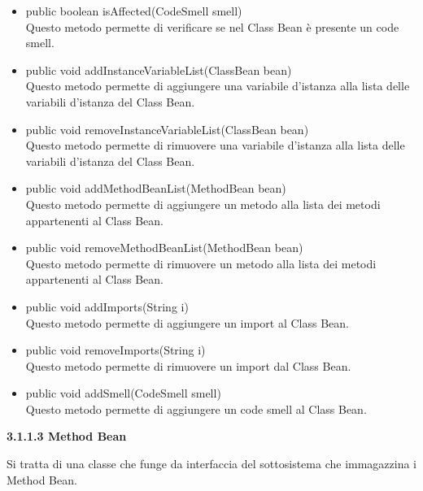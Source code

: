 \documentclass[11pt]{article}
\begin{document}
\begin{description}
				\begin{itemize}
					\item public boolean isAffected(CodeSmell smell)\\
					Questo metodo permette di verificare se nel Class Bean è presente un code smell.
					\item public void addInstanceVariableList(ClassBean bean)\\
					Questo metodo permette di aggiungere una variabile d'istanza alla lista delle variabili d'istanza del Class Bean.
					\item public void removeInstanceVariableList(ClassBean bean)\\
					Questo metodo permette di rimuovere una variabile d'istanza alla lista delle variabili d'istanza del Class Bean.
					\item public void addMethodBeanList(MethodBean bean)\\
					Questo metodo permette di aggiungere un metodo alla lista dei metodi appartenenti al Class Bean.
					\item public void removeMethodBeanList(MethodBean bean)\\
					Questo metodo permette di rimuovere un metodo alla lista dei metodi appartenenti al Class Bean.
					\item public void addImports(String i)\\
					Questo metodo permette di aggiungere un import al Class Bean.
					\item public void removeImports(String i)\\
					Questo metodo permette di rimuovere un import dal Class Bean.
					\item public void addSmell(CodeSmell smell)\\
					Questo metodo permette di aggiungere un code smell al Class Bean.	 
				\end{itemize}
				
				\item \textbf{3.1.1.3  Method Bean} 
				
				\item Si tratta di una classe che funge da interfaccia del sottosistema che immagazzina i Method Bean. 
				

\end{description}
\end{document}
